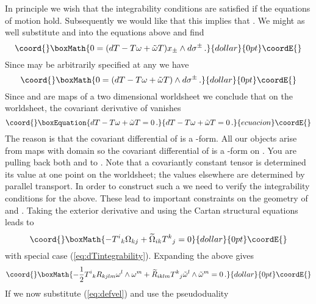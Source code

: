 \documentclass[a4paper,12pt]{article}
\providecommand{\Mtil}{\widetilde{M}}
\providecommand{\Rtil}{\widetilde{R}}
\providecommand{\half}{\frac{1}{2}}
\providecommand{\omegatil}{\tilde{\omega}}
\providecommand{\xtil}{\tilde{x}}
\begin{document}
In principle we wish that the integrability conditions
\myHighlight{$\xtil_{+-}=\xtil_{-+}$}\coordHE{} are satisfied if the equations of motion
\coordHE{} hold.  Subsequently we would like that this implies that
\myHighlight{$\xtil_{+-}=0$}\coordHE{}.  We might as well substitute \coordHE{} and
\myHighlight{$\xtil_{+-}=0$}\coordHE{} into the equations above and find
$$\coord{}\boxMath{
    0 = (dT - T \omega + \omegatil T)x_{\pm}\wedge
    d\sigma^{\pm}\,.
}{dollar}{0pt}\coordE{}$$
Since \coordHE{} may be  arbitrarily specified at any \myHighlight{$\sigma$}\coordHE{} we 
have
$$\coord{}\boxMath{
    0 = (dT - T \omega + \omegatil T)\wedge d\sigma^{\pm}\,.    
}{dollar}{0pt}\coordE{}$$
Since \coordHE{} and \myHighlight{$\xtil:\Sigma\to\Mtil$}\coordHE{} are maps of a two 
dimensional worldsheet we conclude that on the worldsheet, the 
covariant derivative of \coordHE{} vanishes
\begin{equation}\coord{}\boxEquation{
    dT - T \omega + \omegatil T =0\,.    
    \label{eq:covT}
}{
    dT - T \omega + \omegatil T =0\,.    
    }{ecuacion}\coordE{}\end{equation}
The reason is that the covariant differential of \coordHE{} is a \coordHE{}-form. 
All our objects arise from maps with domain \myHighlight{$\Sigma$}\coordHE{} so the covariant
differential of \coordHE{} is a \coordHE{}-form on \myHighlight{$\Sigma$}\coordHE{}.  You are pulling back
both \myHighlight{$\omega$}\coordHE{} and \myHighlight{$\omegatil$}\coordHE{} to \myHighlight{$\Sigma$}\coordHE{}.  Note that a covariantly
constant tensor is determined its value at one point on the
worldsheet; the values elsewhere are determined by parallel transport. 
In order to construct such a \coordHE{} we need to verify the integrability
conditions for the above.  These lead to important constraints on the
geometry of \coordHE{} and \myHighlight{$\Mtil$}\coordHE{}.  Taking the exterior derivative and using
the Cartan structural equations leads to
$$\coord{}\boxMath{
    -T^{i}{}_{k}\Omega_{kj} + \widetilde{\Omega}_{ik}T^{k}{}_{j}=0
}{dollar}{0pt}\coordE{}$$
with special case (\ref{eq:dTintegrability}). Expanding the above gives
$$\coord{}\boxMath{
    -\half T^{i}{}_{k}R_{kjlm}\omega^{l}\wedge\omega^{m}
    + \Rtil_{iklm}T^{k}{}_{j} \omegatil^{l}\wedge\omegatil^{m}=0\,.
}{dollar}{0pt}\coordE{}$$
If we now substitute (\ref{eq:defvel}) and use the pseudoduality 
\end{document}
